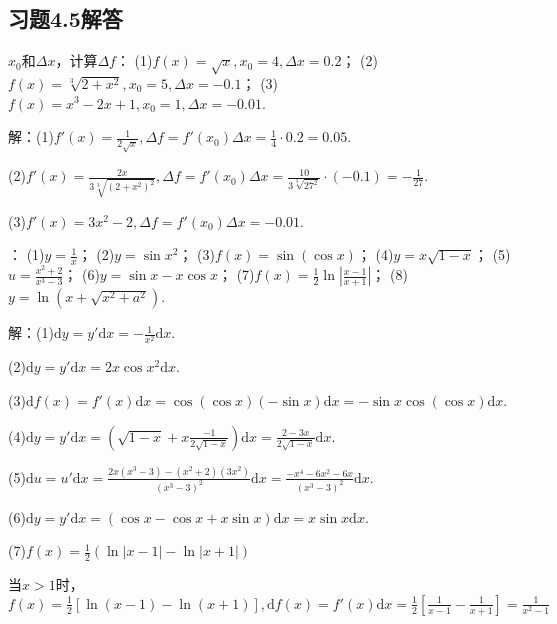 \documentclass[12pt,UTF8]{ctexart}
\begin{document}
\subsection{习题4.5解答}
\begin{enumerate}
$x_0$和$\Delta x$，计算$\Delta f$：
\newline
(1)$f(x)=\sqrt x,x_0=4,\Delta x=0.2$；
\newline
(2)$f(x)=\sqrt[3]{2+x^2},x_0=5,\Delta x=-0.1$；
\newline
(3)$f(x)=x^3-2x+1,x_0=1,\Delta x=-0.01$.

解：(1)$f'(x)=\frac1{2\sqrt x},\Delta f=f'(x_0)\Delta x=\frac14\cdot0.2=0.05$.

(2)$f'(x)=\frac{2x}{3\sqrt[3]{(2+x^2)^2}},\Delta f=f'(x_0)\Delta x=\frac{10}{3\sqrt[3]{27^2}}\cdot(-0.1)=-\frac1{27}$.

(3)$f'(x)=3x^2-2,\Delta f=f'(x_0)\Delta x=-0.01$.

：
\newline
(1)$y=\frac1x$；
\newline
(2)$y=\sin x^2$；
\newline
(3)$f(x)=\sin(\cos x)$；
\newline
(4)$y=x\sqrt{1-x}$；
\newline
(5)$u=\frac{x^2+2}{x^3-3}$；
\newline
(6)$y=\sin x-x\cos x$；
\newline
(7)$f(x)=\frac12\ln|\frac{x-1}{x+1}|$；
\newline
(8)$y=\ln(x+\sqrt{x^2+a^2})$.

解：(1)$\mathrm dy=y'\mathrm dx=-\frac1{x^2}\mathrm dx$.

(2)$\mathrm dy=y'\mathrm dx=2x\cos x^2\mathrm dx$.

(3)$\mathrm df(x)=f'(x)\mathrm dx=\cos(\cos x)(-\sin x)\mathrm dx=-\sin x\cos(\cos x)\mathrm dx$.

(4)$\mathrm dy=y'\mathrm dx=(\sqrt{1-x}+x\frac{-1}{2\sqrt{1-x}})\mathrm dx=\frac{2-3x}{2\sqrt{1-x}}\mathrm dx$.

(5)$\mathrm du=u'\mathrm dx=\frac{2x(x^3-3)-(x^2+2)(3x^2)}{(x^3-3)^2}\mathrm dx=\frac{-x^4-6x^2-6x}{(x^3-3)^2}\mathrm dx$.

(6)$\mathrm dy=y'\mathrm dx=(\cos x-\cos x+x\sin x)\mathrm dx=x\sin x\mathrm dx$.

(7)$f(x)=\frac12(\ln|x-1|-\ln|x+1|)$

当$x>1$时，$f(x)=\frac12[\ln(x-1)-\ln(x+1)],\mathrm df(x)=f'(x)\mathrm dx=\frac12[\frac1{x-1}-\frac1{x+1}]=\frac1{x^2-1}$


\end{enumerate}
\end{document}
